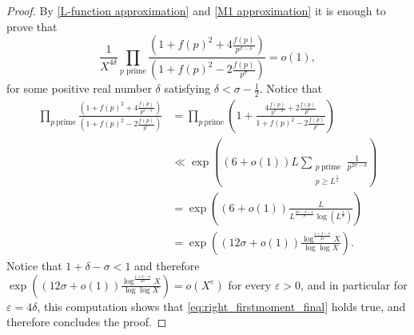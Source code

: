 \documentclass[10pt,a4paper]{amsart}
\begin{document}
\begin{proof}
By \cref{L-function approximation} and \cref{M1 approximation} it is enough to prove that
\begin{equation} \label{eq:right_firstmoment_final}
    \frac{1}{X^{4\delta}}\prod_{p\text{ prime}}\frac{\left(1+f(p)^2+4\frac{f(p)}{p^{\sigma-\delta}}\right)}{\left(1+f(p)^2-2\frac{f(p)}{p^{\sigma}}\right)}=o(1),
\end{equation}
for some positive real number $\delta$ satisfying $\delta<\sigma-\frac{1}{2}$.
Notice that 
\begin{equation}\label{asymM1}
\begin{aligned}
\prod_{p \ \text{prime}} \frac{\left(1+f(p)^2+4\frac{f(p)}{p^{\sigma-\delta}}\right)}{\left(1+f(p)^2-2\frac{f(p)}{p^{\sigma}}\right)}
&=\prod_{p \ \text{prime}}\left(1+\frac{4\frac{f(p)}{p^{\sigma-\delta}}+2\frac{f(p)}{p^\sigma}}{1+f(p)^2-2\frac{f(p)}{p^{\sigma}}}\right) \\
&\ll \exp\left((6+o(1))L\sum_{\substack{p \ \text{prime} \\ p\geq L^{\frac{1}{\sigma}}}}\frac{1}{p^{2\sigma-\delta}}\right) \\ &= \exp\left((6+o(1))\frac{L}{ L^{\frac{2\sigma-\delta-1}{\sigma}}\log( L^{\frac{1}{\sigma}})}\right)\\ &=\exp\left(\left(12\sigma+o(1)\right)\frac{\log^{\frac{1+\delta-\sigma}{2\sigma}} X}{\log\log X}\right).
\end{aligned}
\end{equation}
Notice that $1+\delta-\sigma<1$ and therefore $\exp\left(\left(12\sigma+o(1)\right)\frac{\log^{\frac{1+\delta-\sigma}{2\sigma}} X}{\log\log X}\right) = o(X^{\varepsilon})$ for every $\varepsilon>0$, and in particular for $\varepsilon=4\delta$, this computation shows that \eqref{eq:right_firstmoment_final} holds true, and therefore concludes the proof.
\end{proof}
\end{document}
